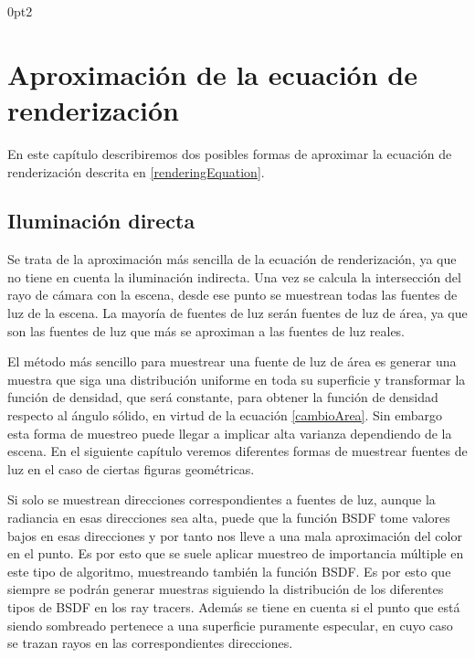 \titlespacing*{\subsection}
  {0pt}{2\baselineskip}{\baselineskip}

\chapter{Aproximación de la ecuación de renderización}

En este capítulo describiremos dos posibles formas de aproximar la ecuación de renderización descrita en \ref{renderingEquation}.

\section{Iluminación directa}
Se trata de la aproximación más sencilla de la ecuación de renderización, ya que no tiene en cuenta la iluminación indirecta. Una vez se calcula la intersección del rayo de cámara con la escena, desde ese punto se muestrean todas las fuentes de luz de la escena. La mayoría de fuentes de luz serán fuentes de luz de área, ya que son las fuentes de luz que más se aproximan a las fuentes de luz reales.

El método más sencillo para muestrear una fuente de luz de área es generar una muestra que siga una distribución uniforme en toda su superficie y transformar la función de densidad, que será constante, para obtener la función de densidad respecto al ángulo sólido, en virtud de la ecuación \ref{cambioArea}. Sin embargo esta forma de muestreo puede llegar a implicar alta varianza dependiendo de la escena. En el siguiente capítulo veremos diferentes formas de muestrear fuentes de luz en el caso de ciertas figuras geométricas.

Si solo se muestrean direcciones correspondientes a fuentes de luz, aunque la radiancia en esas direcciones sea alta, puede que la función BSDF tome valores bajos en esas direcciones y por tanto nos lleve a una mala aproximación del color en el punto. Es por esto que se suele aplicar muestreo de importancia múltiple en este tipo de algoritmo, muestreando también la función BSDF. Es por esto que siempre se podrán generar muestras siguiendo la distribución de los diferentes tipos de BSDF en los ray tracers. Además se tiene en cuenta si el punto que está siendo sombreado pertenece a una superficie puramente especular, en cuyo caso se trazan rayos en las correspondientes direcciones.

